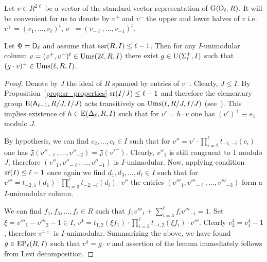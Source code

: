 Let $v\in R^{2\ell}$ be a vector of the standard vector representation of $\operatorname{G}(\mathsf{D}_\ell, R)$.
It will be convenient for us to denote by $v^+$ and $v^-$ the upper and lower halves of $v$ i.e. $v^+=(v_1,\ldots, v_\ell)^t$, $v^-=(v_{-\ell},\ldots, v_{-1})^t$.
\begin{lemma}\label{lemma:asrUnip}
 Let $\Phi=\mathsf{D}_\ell$ and assume that $\operatorname{asr}(R, I)\leq \ell -1$. Then for any $I$-unimodular column $v=(v^+, v^-)^t\in\operatorname{Ums}(2\ell, R, I)$
 there exist $g\in\operatorname{U}(\Sigma^+_\ell, I)$ such that $(g \cdot v)^+ \in \operatorname{Ums}(\ell, R, I)$.
\end{lemma}
\begin{proof} Denote by $J$ the ideal of $R$ spanned by entries of $v^-$. Clearly, $J \leq I$.
By Proposition~\ref{prop:sr_properties} $\operatorname{sr}(I/J) \leq \ell-1$ and therefore
the elementary group $\operatorname{E}(\mathsf{A}_{\ell-1}, R/J, I/J)$ acts transitively on $\operatorname{Ums}(\ell, R/J, I/J)$ (see~\cite[Theorem~2.3c]{Va69}). 
This implies existence of $h\in \operatorname{E}(\Delta_\ell, R, I)$ such that for $v' = h \cdot v$ one has $(v')^+ \equiv e_1$ modulo $J$.

By hypothesis, we can find $c_2,\ldots, c_\ell\in I$ such that for $v''=v'\cdot \prod\limits_{i=2}^{\ell}t_{-1, -i}(c_i)$ one has
$\mathfrak{J}(v''_{-\ell},\ldots, v''_{-2}) = \mathfrak{J}(v'^-)$. Clearly, $v''_1$ is still congruent to $1$ modulo $J$, therefore 
$(v''_1, v''_{-\ell},\ldots, v''_{-1})$ is $I$-unimodular. Now, applying condition $\operatorname{sr}(I) \leq \ell-1$ once again we find
$d_1,d_3,\ldots, d_{\ell}\in I$ such that for $v'''=t_{-2,1}(d_1) \cdot \prod\limits_{i=3}^{\ell} t_{-2,-i}(d_i) \cdot v''$
the entries $(v'''_1, v'''_{-\ell},\ldots, v'''_{-3})$ form a $I$-unimodular column.

We can find $f_1, f_3,\ldots, f_\ell \in R$ such that $f_1v'''_1+\sum\limits_{i=3}^\ell f_i v'''_{-i} = 1$.
Set $\xi = v'''_1-v'''_2-1 \in I$, $v^4=t_{1,2}(\xi f_1) \cdot \prod\limits_{i=3}^\ell t_{-i,2}(\xi f_i) \cdot v'''$.
Clearly $v^4_2 = v^4_1-1$, therefore $v^{4+}$ is $I$-unimodular.
Summarizing the above, we have found $g\in \operatorname{EP}_\ell(R, I)$ such that $v^4=g \cdot v$
and assertion of the lemma immediately follows from Levi decomposition. \end{proof}

